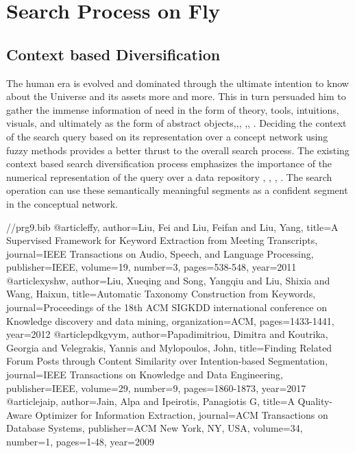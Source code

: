 \documentclass[a4paper, 12pt]{report}
\begin{document}
 
\thispagestyle{empty} 
\setcounter{page}{1}
\chapter{Search Process on Fly}
\section{Context based Diversification} The human era is evolved and dominated through the ultimate intention to know about the Universe and its assets more and more. This in turn persuaded him to gather the immense information of need in the form of theory, tools, intuitions, visuals, and ultimately as the form of abstract objects\cite{ffy},\cite{xyshw},\cite{tbhs}, \cite{dpgk},\cite{jaip}, \cite{pdkgvym}. 
Deciding the context of the search query based on its representation over a concept network using fuzzy methods provides a better thrust to the overall search process. The existing context based search diversification process emphasizes the importance of the numerical representation of the query over a data repository \cite{fpsu}, \cite{sysxh}, \cite{zwjfw}, \cite{dwhh}. The search operation can use these semantically meaningful segments as a confident segment in the conceptual network. 
 

//prg9.bib 
@article{ffy,   
author={Liu, Fei and Liu, Feifan and Liu, Yang},  
title={{A Supervised Framework for Keyword Extraction from Meeting Transcripts}}, 
journal={IEEE Transactions on Audio, Speech, and Language Processing},   publisher={IEEE},   
volume={19}, 
number={3},  
pages={538-548}, 
year={2011} 
} 
@article{xyshw,  
author={Liu, Xueqing and Song, Yangqiu and Liu, Shixia and Wang, Haixun}, 
title={{Automatic Taxonomy Construction from Keywords}},
journal={Proceedings of the 18th ACM SIGKDD international conference on Knowledge discovery and data mining},  
organization={ACM},  
pages={1433-1441},  
year={2012}
}  
@article{pdkgvym, 
author={Papadimitriou, Dimitra and Koutrika, Georgia and Velegrakis, Yannis and Mylopoulos, John},  
title={{Finding Related Forum Posts through Content Similarity over Intention-based Segmentation}}, 
journal={IEEE Transactions on Knowledge and Data Engineering}, 
publisher={IEEE},   
volume={29},  
number={9},  
pages={1860-1873}, 
year={2017}
} 
@article{jaip, 
author={Jain, Alpa and Ipeirotis, Panagiotis G},
title={{A Quality-Aware Optimizer for Information Extraction}},  
journal={ACM Transactions on Database Systems},   
publisher={ACM New York, NY, USA},  
volume={34},   
number={1},  
pages={1-48},  
year={2009}
} 
\end{document}
